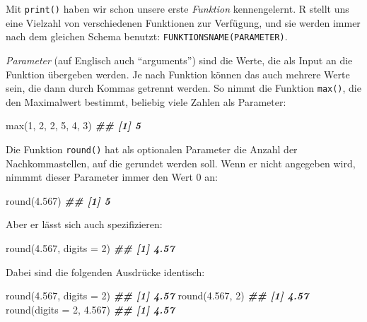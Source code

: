 \documentclass[11pt,german,a4paper]{article}
\newenvironment{Shaded}{\begin{snugshade}}{\end{snugshade}}
\newcommand{\AttributeTok}[1]{\textcolor[rgb]{0.77,0.63,0.00}{#1}}
\newcommand{\DecValTok}[1]{\textcolor[rgb]{0.00,0.00,0.81}{#1}}
\newcommand{\DocumentationTok}[1]{\textcolor[rgb]{0.56,0.35,0.01}{\textbf{\textit{#1}}}}
\newcommand{\FloatTok}[1]{\textcolor[rgb]{0.00,0.00,0.81}{#1}}
\newcommand{\FunctionTok}[1]{\textcolor[rgb]{0.00,0.00,0.00}{#1}}
\newcommand{\NormalTok}[1]{#1}
\begin{document}
Mit \texttt{print()} haben wir schon unsere erste \emph{Funktion} kennengelernt. R stellt uns eine Vielzahl von verschiedenen Funktionen zur Verfügung, und sie werden immer nach dem gleichen Schema benutzt: \texttt{FUNKTIONSNAME(PARAMETER)}.

\emph{Parameter} (auf Englisch auch ``arguments'') sind die Werte, die als Input an die Funktion übergeben werden. Je nach Funktion können das auch mehrere Werte sein, die dann durch Kommas getrennt werden. So nimmt die Funktion \texttt{max()}, die den Maximalwert bestimmt, beliebig viele Zahlen als Parameter:

\begin{Shaded}
\begin{Highlighting}[]
\FunctionTok{max}\NormalTok{(}\DecValTok{1}\NormalTok{, }\DecValTok{2}\NormalTok{, }\DecValTok{2}\NormalTok{, }\DecValTok{5}\NormalTok{, }\DecValTok{4}\NormalTok{, }\DecValTok{3}\NormalTok{)}
\DocumentationTok{\#\# [1] 5}
\end{Highlighting}
\end{Shaded}

Die Funktion \texttt{round()} hat als optionalen Parameter die Anzahl der Nachkommastellen, auf die gerundet werden soll. Wenn er nicht angegeben wird, nimmmt dieser Parameter immer den Wert 0 an:

\begin{Shaded}
\begin{Highlighting}[]
\FunctionTok{round}\NormalTok{(}\FloatTok{4.567}\NormalTok{)}
\DocumentationTok{\#\# [1] 5}
\end{Highlighting}
\end{Shaded}

Aber er lässt sich auch spezifizieren:

\begin{Shaded}
\begin{Highlighting}[]
\FunctionTok{round}\NormalTok{(}\FloatTok{4.567}\NormalTok{, }\AttributeTok{digits =} \DecValTok{2}\NormalTok{)}
\DocumentationTok{\#\# [1] 4.57}
\end{Highlighting}
\end{Shaded}

Dabei sind die folgenden Ausdrücke identisch:

\begin{Shaded}
\begin{Highlighting}[]
\FunctionTok{round}\NormalTok{(}\FloatTok{4.567}\NormalTok{, }\AttributeTok{digits =} \DecValTok{2}\NormalTok{)}
\DocumentationTok{\#\# [1] 4.57}
\FunctionTok{round}\NormalTok{(}\FloatTok{4.567}\NormalTok{, }\DecValTok{2}\NormalTok{)}
\DocumentationTok{\#\# [1] 4.57}
\FunctionTok{round}\NormalTok{(}\AttributeTok{digits =} \DecValTok{2}\NormalTok{, }\FloatTok{4.567}\NormalTok{)}
\DocumentationTok{\#\# [1] 4.57}
\end{Highlighting}
\end{Shaded}
\end{document}
